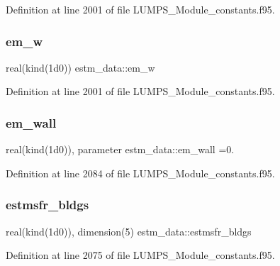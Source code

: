 Definition at line 2001 of file L\+U\+M\+P\+S\+\_\+\+Module\+\_\+constants.\+f95.

\mbox{\label{namespaceestm__data_a603b2198df6b2c26f5aabbec5b04ef72}} 
\subsubsection{\texorpdfstring{em\+\_\+w}{em\_w}}
{\footnotesize\ttfamily real(kind(1d0)) estm\+\_\+data\+::em\+\_\+w}



Definition at line 2001 of file L\+U\+M\+P\+S\+\_\+\+Module\+\_\+constants.\+f95.

\mbox{\label{namespaceestm__data_afe2e8c1c729a44384912e9085576bc4b}} 
\subsubsection{\texorpdfstring{em\+\_\+wall}{em\_wall}}
{\footnotesize\ttfamily real(kind(1d0)), parameter estm\+\_\+data\+::em\+\_\+wall =0.}



Definition at line 2084 of file L\+U\+M\+P\+S\+\_\+\+Module\+\_\+constants.\+f95.

\mbox{\label{namespaceestm__data_a8b2fa2867ca58a77b5dc128d74407658}} 
\subsubsection{\texorpdfstring{estmsfr\+\_\+bldgs}{estmsfr\_bldgs}}
{\footnotesize\ttfamily real(kind(1d0)), dimension(5) estm\+\_\+data\+::estmsfr\+\_\+bldgs}



Definition at line 2075 of file L\+U\+M\+P\+S\+\_\+\+Module\+\_\+constants.\+f95.

\mbox{\label{namespaceestm__data_ae476f025b928a0aa7b7a57df9f0b253f}} 
